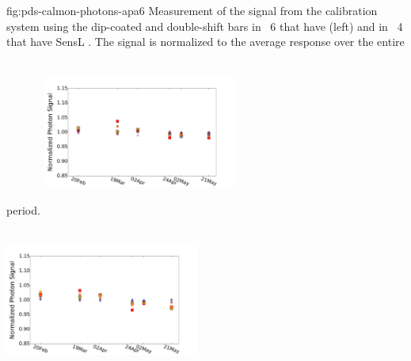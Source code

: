 \begin{dunefigure}
 {fig:pds-calmon-photons-apa6}
 {Measurement of the signal from the calibration system using the dip-coated and double-shift bars in ~6 that have   (left) and in ~4 that have SensL . The signal is normalized to the average response over the entire period.
 }
  \includegraphics[height=5.5cm,width=0.48\textwidth]{graphics/pds-avg-mean-adc-led-apa6-mppc.pdf}
  \includegraphics[height=5.5cm,width=0.48\textwidth]{graphics/pds-avg-mean-adc-led-apa4-sensl.pdf}

\end{dunefigure}